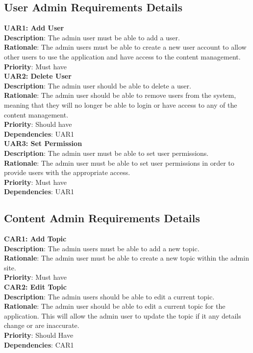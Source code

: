 \documentclass{l3proj}
\begin{document}
\subsection{User Admin Requirements Details}

\textbf{UAR1: Add User} \\
\textbf{Description}: The admin user must be able to add a user.  \\
\textbf{Rationale}: The admin users must be able to create a new user account to allow other users to use the application and have access to the content management.\\
\textbf{Priority}: Must have \\

\textbf{UAR2: Delete User} \\
\textbf{Description}: The admin user should be able to delete a user. \\ 
\textbf{Rationale}: The admin user should be able to remove users from the system, meaning that they will no longer be able to login or have access to any of the content management.\\
\textbf{Priority}: Should have \\
\textbf{Dependencies}: UAR1\\

\textbf{UAR3: Set Permission} \\
\textbf{Description}: The admin user must be able to set user permissions.\\
\textbf{Rationale}: The admin user must be able to set user permissions in order to provide users with the appropriate access.\\
\textbf{Priority}: Must have \\
\textbf{Dependencies}: UAR1\\

\subsection{Content Admin Requirements Details}

\textbf{CAR1: Add Topic}\\
\textbf{Description}:  The admin users must be able to add a new topic. \\
\textbf{Rationale}: The admin user must be able to create a new topic within the admin site. \\
\textbf{Priority}: Must have\\


\textbf{CAR2: Edit Topic}\\
\textbf{Description}: The admin users should be able to edit a current topic.\\
\textbf{Rationale}: The admin user should be able to edit a current topic for the application. This will allow the admin user to update the topic if it any details change or are inaccurate.\\
\textbf{Priority}: Should Have \\
\textbf{Dependencies}: CAR1\\
\end{document}
